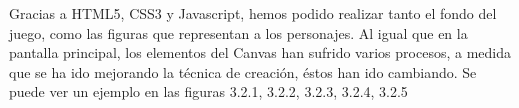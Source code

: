 Gracias a HTML5, CSS3 y Javascript, hemos podido realizar tanto el fondo del juego, como las figuras que representan a los personajes.
Al igual que en la pantalla principal, los elementos del Canvas han sufrido varios procesos, a medida que se ha ido mejorando la técnica de creación, éstos han ido cambiando.
Se puede ver un ejemplo en las figuras 3.2.1, 3.2.2, 3.2.3, 3.2.4, 3.2.5



% 
